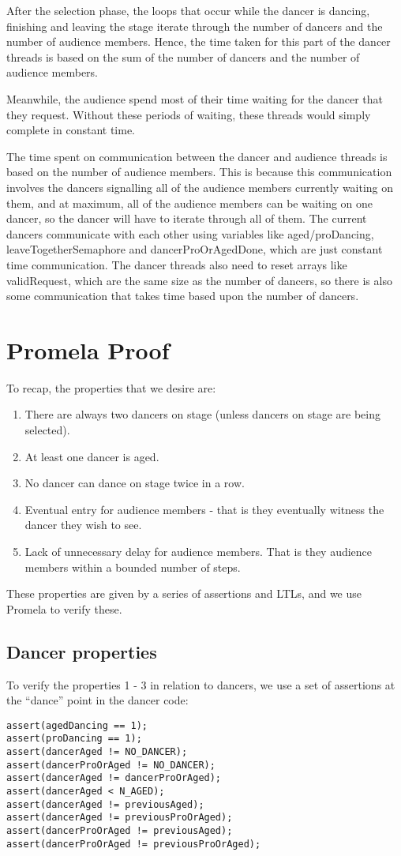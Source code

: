 \documentclass[12pt,a4paper]{scrartcl}
\begin{document}
After the selection phase, the loops that occur while the dancer is dancing, finishing and leaving the stage iterate through the number of dancers and the number of audience members. Hence, the time taken for this part of the dancer threads is based on the sum of the number of dancers and the number of audience members.

Meanwhile, the audience spend most of their time waiting for the dancer that they request. Without these periods of waiting, these threads would simply complete in constant time.

The time spent on communication between the dancer and audience threads is based on the number of audience members. This is because this communication involves the dancers signalling all of the audience members currently waiting on them, and at maximum, all of the audience members can be waiting on one dancer, so the dancer will have to iterate through all of them. The current dancers communicate with each other using variables like aged/proDancing, leaveTogetherSemaphore and dancerProOrAgedDone, which are just constant time communication. The dancer threads also need to reset arrays like validRequest, which are the same size as the number of dancers, so there is also some communication that takes time based upon the number of dancers.

\section{Promela Proof}
To recap, the properties that we desire are:
\begin{enumerate}
    \item There are always two dancers on stage (unless dancers on stage are being selected).
    \item At least one dancer is aged.
    \item No dancer can dance on stage twice in a row.
    \item Eventual entry for audience members - that is they eventually witness the dancer they wish to see.
    \item Lack of unnecessary delay for audience members.
          That is they audience members within a bounded number of steps.
\end{enumerate}

These properties are given by a series of assertions and LTLs, and we use Promela to verify these.

\subsection{Dancer properties}
To verify the properties 1 - 3 in relation to dancers, we use a set of assertions at the ``dance'' point in the dancer code:
\begin{lstlisting}
assert(agedDancing == 1);
assert(proDancing == 1);
assert(dancerAged != NO_DANCER);
assert(dancerProOrAged != NO_DANCER);
assert(dancerAged != dancerProOrAged);
assert(dancerAged < N_AGED);
assert(dancerAged != previousAged);
assert(dancerAged != previousProOrAged);
assert(dancerProOrAged != previousAged);
assert(dancerProOrAged != previousProOrAged);
\end{lstlisting}
\end{document}
